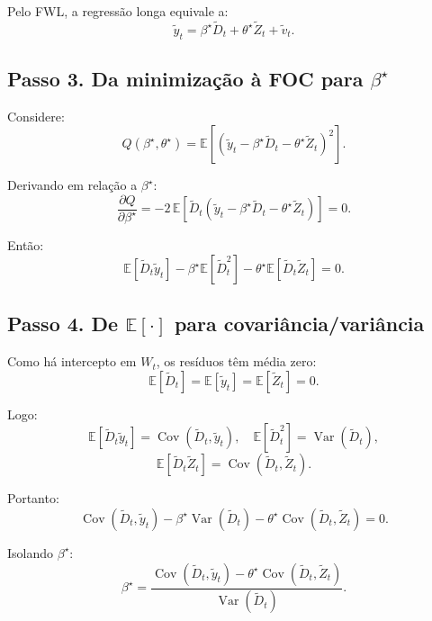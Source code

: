 \documentclass[
]{article}
\begin{document}
Pelo FWL, a regressão longa equivale a: \[
\widetilde{y}_t=\beta^\star\widetilde{D}_t+\theta^\star\widetilde{Z}_t+\widetilde{v}_t.
\]

\subsection{\texorpdfstring{Passo 3. Da minimização à FOC para
\(\beta^\star\)}{Passo 3. Da minimização à FOC para \textbackslash beta\^{}\textbackslash star}}\label{passo-3.-da-minimizauxe7uxe3o-uxe0-foc-para-betastar}

Considere: \[
Q(\beta^\star,\theta^\star)=
\mathbb{E}\!\left[\left(\widetilde{y}_t-\beta^\star\widetilde{D}_t-\theta^\star\widetilde{Z}_t\right)^2\right].
\]

Derivando em relação a \(\beta^\star\): \[
\frac{\partial Q}{\partial \beta^\star}
=
-2\,\mathbb{E}\!\left[\widetilde{D}_t\left(\widetilde{y}_t-\beta^\star\widetilde{D}_t-\theta^\star\widetilde{Z}_t\right)\right]=0.
\]

Então: \[
\mathbb{E}[\widetilde{D}_t\widetilde{y}_t]
-\beta^\star\mathbb{E}[\widetilde{D}_t^2]
-\theta^\star\mathbb{E}[\widetilde{D}_t\widetilde{Z}_t]=0.
\]

\subsection{\texorpdfstring{Passo 4. De \(\mathbb{E}[\cdot]\) para
covariância/variância}{Passo 4. De \textbackslash mathbb\{E\}{[}\textbackslash cdot{]} para covariância/variância}}\label{passo-4.-de-mathbbecdot-para-covariuxe2nciavariuxe2ncia}

Como há intercepto em \(W_t\), os resíduos têm média zero: \[
\mathbb{E}[\widetilde{D}_t]=\mathbb{E}[\widetilde{y}_t]=\mathbb{E}[\widetilde{Z}_t]=0.
\]

Logo: \[
\mathbb{E}[\widetilde{D}_t\widetilde{y}_t]
=
\operatorname{Cov}(\widetilde{D}_t,\widetilde{y}_t),
\quad
\mathbb{E}[\widetilde{D}_t^2]
=
\operatorname{Var}(\widetilde{D}_t),
\] \[
\mathbb{E}[\widetilde{D}_t\widetilde{Z}_t]
=
\operatorname{Cov}(\widetilde{D}_t,\widetilde{Z}_t).
\]

Portanto: \[
\operatorname{Cov}(\widetilde{D}_t,\widetilde{y}_t)
-\beta^\star\operatorname{Var}(\widetilde{D}_t)
-\theta^\star\operatorname{Cov}(\widetilde{D}_t,\widetilde{Z}_t)=0.
\]

Isolando \(\beta^\star\): \[
\beta^\star=
\frac{\operatorname{Cov}(\widetilde{D}_t,\widetilde{y}_t)-\theta^\star\operatorname{Cov}(\widetilde{D}_t,\widetilde{Z}_t)}
{\operatorname{Var}(\widetilde{D}_t)}.
\]
\end{document}
